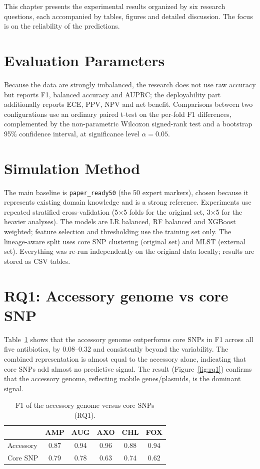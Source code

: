 \documentclass[../main.tex]{subfiles}
\begin{document}
This chapter presents the experimental results organized by six research questions, each accompanied by tables, figures and detailed discussion. The focus is on the reliability of the predictions.

\section{Evaluation Parameters}

Because the data are strongly imbalanced, the research does not use raw accuracy but reports F1, balanced accuracy and AUPRC; the deployability part additionally reports ECE, PPV, NPV and net benefit. Comparisons between two configurations use an ordinary paired t-test on the per-fold F1 differences, complemented by the non-parametric Wilcoxon signed-rank test and a bootstrap 95\% confidence interval, at significance level $\alpha = 0.05$.

\section{Simulation Method}

The main baseline is \texttt{paper\_ready50} (the 50 expert markers), chosen because it represents existing domain knowledge and is a strong reference. Experiments use repeated stratified cross-validation (5$\times$5 folds for the original set, 3$\times$5 for the heavier analyses). The models are LR balanced, RF balanced and XGBoost weighted; feature selection and thresholding use the training set only. The lineage-aware split uses core SNP clustering (original set) and MLST (external set). Everything was re-run independently on the original data locally; results are stored as CSV tables.

\section{RQ1: Accessory genome vs core SNP}

Table~\ref{tab:rq1} shows that the accessory genome outperforms core SNPs in F1 across all five antibiotics, by 0.08--0.32 and consistently beyond the variability. The combined representation is almost equal to the accessory alone, indicating that core SNPs add almost no predictive signal. The result (Figure~\ref{fig:rq1}) confirms that the accessory genome, reflecting mobile genes/plasmids, is the dominant signal.

\begin{table}[H]
\centering
\caption{F1 of the accessory genome versus core SNPs (RQ1).}
\label{tab:rq1}
\begin{tabular}{lccccc}
\hline
& AMP & AUG & AXO & CHL & FOX \\ \hline
Accessory & 0.87 & 0.94 & 0.96 & 0.88 & 0.94 \\
Core SNP  & 0.79 & 0.78 & 0.63 & 0.74 & 0.62 \\ \hline
\end{tabular}
\end{table}
\end{document}
